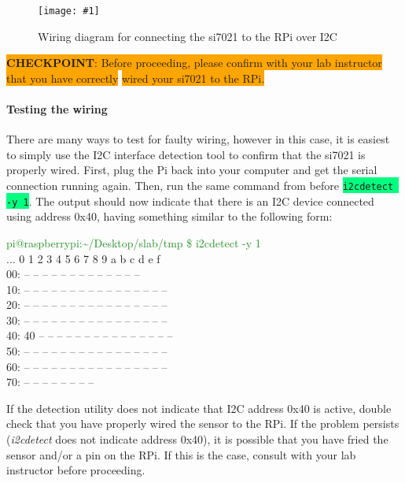 \documentclass{article}
\newcommand*{\myfont}{\fontfamily{pcr}\selectfont}
\newcommand{\codei}[1]{\colorbox{SpringGreen}{\texttt{#1}}} %
\newcommand{\outputb}[2]{
  \begin{tcolorbox}[width=\textwidth,colback={light-gray},title={#1},colbacktitle=gray,coltitle=light-gray]
    \myfont
    #2
  \end{tcolorbox}
} %
\newcommand{\imagefigb}[2]{
    \begin{figure}[H]
        \centering
        \texttt{[image: \#1]}
        \caption{#2}
    \end{figure}
}
\newcommand{\checkpoint}[2]{
    \newline \newline
    \noindent
    \colorbox{Orange}{\textbf{CHECKPOINT}: #1} \newline \colorbox{Orange}{#2}
    \newline \newline
}
\begin{document}
    \imagefigb{si7021-wiring-diagram.png}{Wiring diagram for connecting the si7021 to the RPi over I2C}
    \checkpoint{Before proceeding, please confirm with your lab instructor that you have correctly}{wired your si7021 to the RPi.}

  \paragraph{Testing the wiring}
  There are many ways to test for faulty wiring, however in this case, it is easiest to simply use the I2C interface detection tool to confirm that the si7021 is properly wired. First, plug the Pi back into your computer and get the serial connection running again. Then, run the same command from before \codei{i2cdetect -y 1}. The output should now indicate that there is an I2C device connected using address 0x40, having something similar to the following form:
  \outputb{I2C detection output (si7021 wired)}
  {
    \textcolor{ForestGreen}{pi@raspberrypi:\textasciitilde/Desktop/slab/tmp \$ i2cdetect -y 1} \\
    ...  0  1  2  3  4  5  6  7  8  9  a  b  c  d  e  f \\
    00:          -- -- -- -- -- -- -- -- -- -- -- -- -- \\
    10: -- -- -- -- -- -- -- -- -- -- -- -- -- -- -- -- \\
    20: -- -- -- -- -- -- -- -- -- -- -- -- -- -- -- -- \\
    30: -- -- -- -- -- -- -- -- -- -- -- -- -- -- -- -- \\
    40: 40 -- -- -- -- -- -- -- -- -- -- -- -- -- -- -- \\
    50: -- -- -- -- -- -- -- -- -- -- -- -- -- -- -- -- \\
    60: -- -- -- -- -- -- -- -- -- -- -- -- -- -- -- -- \\
    70: -- -- -- -- -- -- -- --
  }

  If the detection utility does not indicate that I2C address 0x40 is active, double check that you have properly wired the sensor to the RPi. If the problem persists (\textit{i2cdetect} does not indicate address 0x40), it is possible that you have fried the sensor and/or a pin on the RPi. If this is the case, consult with your lab instructor before proceeding.
\end{document}
